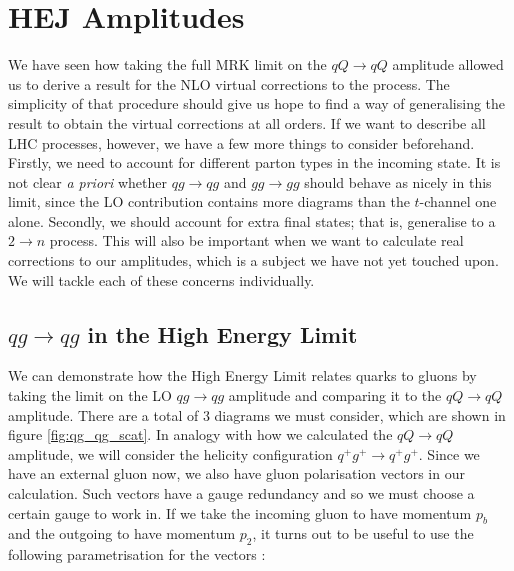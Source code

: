 
\section{HEJ Amplitudes}

We have seen how taking the full MRK limit on the $qQ \to qQ$ amplitude allowed us to derive a result for the NLO virtual corrections to the process. The simplicity of that procedure should give us hope to find a way of generalising the result to obtain the virtual corrections at all orders. If we want to describe all LHC processes, however, we have a few more things to consider beforehand. Firstly, we need to account for different parton types in the incoming state. It is not clear \emph{a priori} whether $qg \to qg$ and $gg \to gg$ should behave as nicely in this limit, since the LO contribution contains more diagrams than the $t$-channel one alone. Secondly, we should account for extra final states; that is, generalise to a $2 \to n$ process. This will also be important when we want to calculate real corrections to our amplitudes, which is a subject we have not yet touched upon. We will tackle each of these concerns individually. 

\subsection{$qg \to qg$ in the High Energy Limit}
We can demonstrate how the High Energy Limit relates quarks to gluons by taking the limit on the LO $qg \to qg$ amplitude and comparing it to the $qQ \to qQ$ amplitude. There are a total of 3 diagrams we must consider, which are shown in figure \ref{fig:qg_qg_scat}. In analogy with how we calculated the $qQ \to qQ$ amplitude, we will consider the helicity configuration $q^+ g^+ \to q^+ g^+$. Since we have an external gluon now, we also have gluon polarisation vectors in our calculation. Such vectors have a gauge redundancy and so we must choose a certain gauge to work in. If we take the incoming gluon to have momentum $p_b$ and the outgoing to have momentum $p_2$, it turns out to be useful to use the following parametrisation for the vectors \cite{Dixon1996, Andersen2010}:

